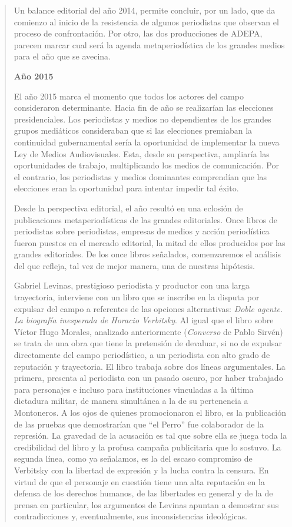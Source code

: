 \begin{quote}
Un balance editorial del año 2014, permite concluir, por un lado, que da comienzo al inicio de la resistencia de algunos periodistas que observan el proceso de confrontación. Por otro, las dos producciones de ADEPA, parecen marcar cual será la agenda metaperiodística de los grandes medios para el año que se avecina.

\textbf{Año 2015}

El año 2015 marca el momento que todos los actores del campo consideraron determinante. Hacia fin de año se realizarían las elecciones presidenciales. Los periodistas y medios no dependientes de los grandes grupos mediáticos consideraban que si las elecciones premiaban la continuidad gubernamental sería la oportunidad de implementar la nueva Ley de Medios Audiovisuales. Esta, desde su perspectiva, ampliaría las oportunidades de trabajo, multiplicando los medios de comunicación. Por el contrario, los periodistas y medios dominantes comprendían que las elecciones eran la oportunidad para intentar impedir tal éxito.

Desde la perspectiva editorial, el año resultó en una eclosión de publicaciones metaperiodísticas de las grandes editoriales. Once libros de periodistas sobre periodistas, empresas de medios y acción periodística fueron puestos en el mercado editorial, la mitad de ellos producidos por las grandes editoriales. De los once libros señalados, comenzaremos el análisis del que refleja, tal vez de mejor manera, una de nuestras hipótesis.

Gabriel Levinas, prestigioso periodista y productor con una larga trayectoria, interviene con un libro que se inscribe en la disputa por expulsar del campo a referentes de las opciones alternativas: \emph{Doble agente. La biografía inesperada de Horacio Verbitsky}. Al igual que el libro sobre Víctor Hugo Morales, analizado anteriormente (\emph{Converso} de Pablo Sirvén) se trata de una obra que tiene la pretensión de devaluar, si no de expulsar directamente del campo periodístico, a un periodista con alto grado de reputación y trayectoria. El libro trabaja sobre dos líneas argumentales. La primera, presenta al periodista con un pasado oscuro, por haber trabajado para personajes e incluso para instituciones vinculadas a la última dictadura militar, de manera simultánea a la de su pertenencia a Montoneros. A los ojos de quienes promocionaron el libro, es la publicación de las pruebas que demostrarían que \enquote{el Perro} fue colaborador de la represión. La gravedad de la acusación es tal que sobre ella se juega toda la credibilidad del libro y la profusa campaña publicitaria que lo sostuvo. La segunda línea, como ya señalamos, es la del escaso compromiso de Verbitsky con la libertad de expresión y la lucha contra la censura. En virtud de que el personaje en cuestión tiene una alta reputación en la defensa de los derechos humanos, de las libertades en general y de la de prensa en particular, los argumentos de Levinas apuntan a demostrar sus contradicciones y, eventualmente, sus inconsistencias ideológicas.


\end{quote}
